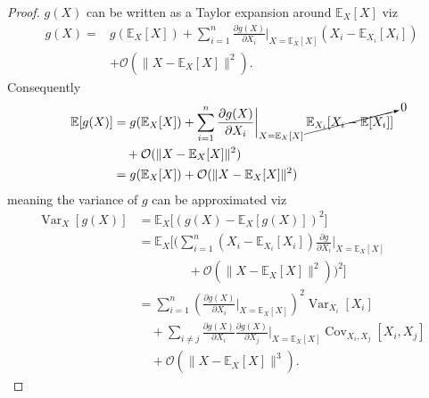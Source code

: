 \begin{proof}
	$g(X)$ can be written as a Taylor expansion around $\mathbb{E}_X[X]$ viz
	\begin{equation}
		\begin{split}
			g(X) = &g(\mathbb{E}_X[X]) + \sum_{i=1}^n  \frac{\partial g(X)}{\partial X_i} \bigg|_{X = \mathbb{E}_X[X]} (X_i - \mathbb{E}_{X_i}[X_i])\\
			& + \mathcal{O}(\|X - \mathbb{E}_X[X]\|^2).
		\end{split}
		\label{e1}
	\end{equation}
	Consequently
	\begin{equation}
		\begin{split}
			\mathbb{E}[g(X)] &= g(\mathbb{E}_X[X])+ \sum_{i=1}^n \frac{\partial g(X)}{\partial X_i} \bigg|_{X = \mathbb{E}_X[X]}\, \cancelto{0}{\mathbb{E}_{X_i}[X_i - \mathbb{E}[X_i]]}\\
			&\quad  + \mathcal{O}(\|X - \mathbb{E}_X[X]\|^2)\\
			& = g(\mathbb{E}_X[X]) + \mathcal{O}(\|X - \mathbb{E}_X[X]\|^2)\\
		\end{split}
		\label{e2}
	\end{equation}
	meaning the variance of $g$ can be approximated viz
	\begin{equation}
		\begin{split}
			\operatorname{Var}_X[g(X)] &= \mathbb{E}_X\big[(g(X) - \mathbb{E}_X[g(X)])^2\big] \\
			&= \mathbb{E}_X\bigg[\bigg( \sum_{i=1}^n (X_i - \mathbb{E}_{X_i}[X_i]) \frac{\partial g}{\partial X_i}\bigg|_{X=\mathbb{E}_X[X]}\\
			&\qquad\qquad + \mathcal{O}(\|X - \mathbb{E}_X[X]\|^2)\bigg)^2\bigg] \\
			&= \sum_{i=1}^n \left(\frac{\partial g(X)}{\partial X_i}\bigg|_{X = \mathbb{E}_X[X]}\right)^{\!2} \operatorname{Var}_{X_i}[X_i]
			\\&\quad+ \sum_{i \neq j} \frac{\partial g(X)}{\partial X_i}\frac{\partial g(X)}{\partial X_j}\bigg|_{X = \mathbb{E}_X[X]} \operatorname{Cov}_{X_i,X_j}[X_i, X_j]\\
			&\quad+ \mathcal{O}(\|X - \mathbb{E}_X[X]\|^3).
		\end{split}
	\end{equation}
\end{proof}


